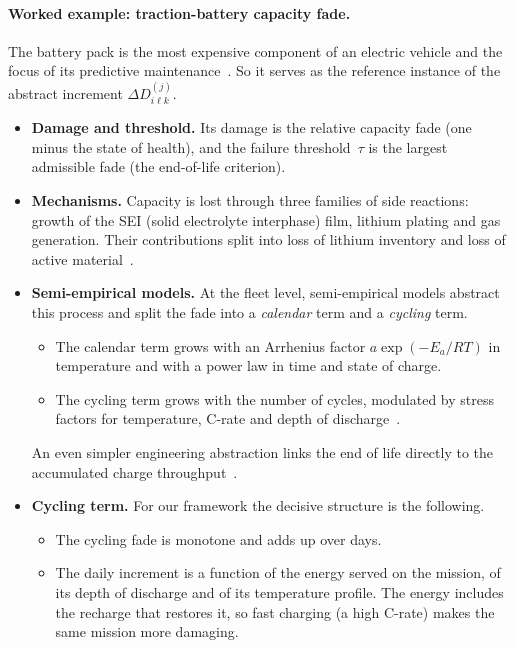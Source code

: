 \documentclass[11pt,a4paper]{article}
\theoremstyle{plain}
\theoremstyle{definition}
\theoremstyle{remark}
\begin{document}
\begin{examplebox}
\paragraph{Worked example: traction-battery capacity fade.}
The battery pack is the most expensive component of an electric vehicle and the focus of its predictive maintenance~\cite[Secs.~2,~4.2]{Ibrahim2025}.
So it serves as the reference instance of the abstract increment $\Delta D^{(j)}_{i\ell k}$.
\begin{itemize}
  \item \textbf{Damage and threshold.}
    Its damage is the relative capacity fade (one minus the state of health), and the failure threshold~$\tau$ is the largest admissible fade (the end-of-life criterion).
  \item \textbf{Mechanisms.}
    Capacity is lost through three families of side reactions: growth of the SEI (solid electrolyte interphase) film, lithium plating and gas generation.
    Their contributions split into loss of lithium inventory and loss of active material~\cite[Secs.~2.1,~4.1, Eqs.~28--29]{Lv2025}.
  \item \textbf{Semi-empirical models.}
    At the fleet level, semi-empirical models abstract this process and split the fade into a \emph{calendar} term and a \emph{cycling} term.
    \begin{itemize}
      \item The calendar term grows with an Arrhenius factor $a\exp(-E_a/RT)$ in temperature and with a power law in time and state of charge.
      \item The cycling term grows with the number of cycles, modulated by stress factors for temperature, C-rate and depth of discharge~\cite[Eqs.~1--3]{Hosen2021}.
    \end{itemize}
    An even simpler engineering abstraction links the end of life directly to the accumulated charge throughput~\cite[Sec.~4.2]{Ibrahim2025}.
  \item \textbf{Cycling term.}
    For our framework the decisive structure is the following.
    \begin{itemize}
      \item The cycling fade is monotone and adds up over days.
      \item The daily increment is a function of the energy served on the mission, of its depth of discharge and of its temperature profile.
        The energy includes the recharge that restores it, so fast charging (a high C-rate) makes the same mission more damaging.

\end{itemize}
\end{itemize}
\end{examplebox}
\end{document}
